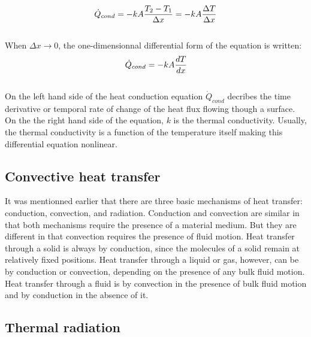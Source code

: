 \\
\begin{equation}
    \dot{Q}_{cond} = -kA\frac{T_2 - T_1}{\Delta x} = -kA\frac{\Delta T}{\Delta x}
    \tagaddtext{[\si{\watt}]}
    \label{eqn:CondEqInt}
\end{equation}
\\
\normalsize{When $\Delta x \rightarrow 0$,  the one-dimensionnal differential form of the equation is written:}
\\
\begin{equation}
    \dot{Q}_{cond} = -kA\frac{dT}{dx}
    \tagaddtext{[\si{\watt}]}
    \label{eqn:CondEq}
\end{equation}
\\
\normalsize{\indent On the left hand side of the heat conduction equation  $\dot{Q}_{cond}$ decribes the time derivative or temporal rate of change of the heat flux flowing though a surface. On the the right hand side of the equation, $k$ is the thermal conductivity. Usually, the thermal conductivity is a function of the temperature itself making this differential equation nonlinear. }
\\
\subsection{Convective heat transfer}
\normalsize{It was mentionned earlier that there are three basic mechanisms of heat transfer: conduction, convection, and radiation. Conduction and convection are similar in that both mechanisms require the presence of a material medium. But they are different in that convection requires the presence of fluid motion. Heat transfer through a solid is always by conduction, since the molecules of a solid remain at relatively fixed positions. Heat transfer through a liquid or
gas, however, can be by conduction or convection, depending on the presence of any bulk fluid motion. Heat transfer through a fluid is by convection in the presence of bulk fluid motion and by conduction in the absence of it.}
\subsection{Thermal radiation}